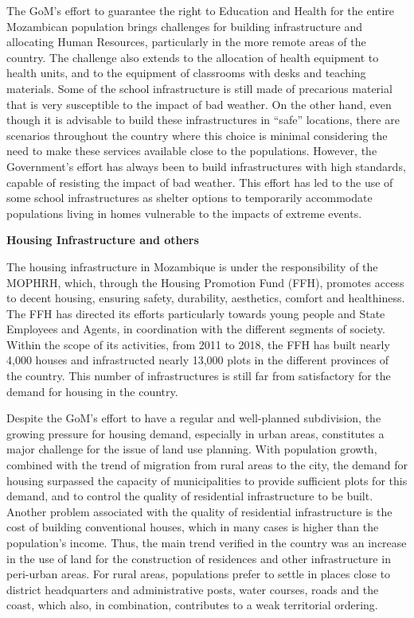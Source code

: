 \documentclass[
]{book}
\begin{document}
The GoM's effort to guarantee the right to Education and Health for the entire Mozambican population brings challenges for building infrastructure and allocating Human Resources, particularly in the more remote areas of the country. The challenge also extends to the allocation of health equipment to health units, and to the equipment of classrooms with desks and teaching materials. Some of the school infrastructure is still made of precarious material that is very susceptible to the impact of bad weather. On the other hand, even though it is advisable to build these infrastructures in ``safe'' locations, there are scenarios throughout the country where this choice is minimal considering the need to make these services available close to the populations. However, the Government's effort has always been to build infrastructures with high standards, capable of resisting the impact of bad weather. This effort has led to the use of some school infrastructures as shelter options to temporarily accommodate populations living in homes vulnerable to the impacts of extreme events.

\textbf{Housing Infrastructure and others}

The housing infrastructure in Mozambique is under the responsibility of the MOPHRH, which, through the Housing Promotion Fund (FFH), promotes access to decent housing, ensuring safety, durability, aesthetics, comfort and healthiness. The FFH has directed its efforts particularly towards young people and State Employees and Agents, in coordination with the different segments of society. Within the scope of its activities, from 2011 to 2018, the FFH has built nearly 4,000 houses and infrastructed nearly 13,000 plots in the different provinces of the country. This number of infrastructures is still far from satisfactory for the demand for housing in the country.

Despite the GoM's effort to have a regular and well-planned subdivision, the growing pressure for housing demand, especially in urban areas, constitutes a major challenge for the issue of land use planning. With population growth, combined with the trend of migration from rural areas to the city, the demand for housing surpassed the capacity of municipalities to provide sufficient plots for this demand, and to control the quality of residential infrastructure to be built. Another problem associated with the quality of residential infrastructure is the cost of building conventional houses, which in many cases is higher than the population's income. Thus, the main trend verified in the country was an increase in the use of land for the construction of residences and other infrastructure in peri-urban areas. For rural areas, populations prefer to settle in places close to district headquarters and administrative posts, water courses, roads and the coast, which also, in combination, contributes to a weak territorial ordering.
\end{document}
